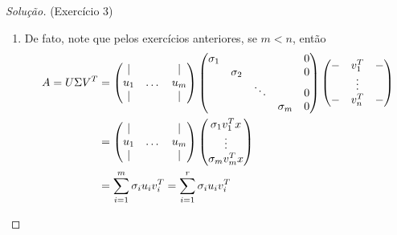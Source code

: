 \documentclass[a4paper,10pt]{article}
\newenvironment{solution}
  {\begin{proof}[Solução]}
  {\end{proof}}
\begin{document}
\begin{solution}{(Exercício 3)}
\begin{enumerate}
        \item De fato, note que pelos exercícios anteriores, se $m<n$, então
          \begin{equation*}
            \begin{split}
              A = U\Sigma V^T &=
              \begin{pmatrix}
                  \vert & & \vert \\
                  u_1 & \dots & u_m \\
                  \vert & & \vert
                \end{pmatrix}
                \begin{pmatrix}
                  \sigma_1 & & &  &0 \\
                  &\sigma_2 & & & 0 \\
                  & & \ddots & & 0 \\
                  & & &\sigma_m & 0
                \end{pmatrix}
                \begin{pmatrix}
                    \-- & v_1^T & \-- \\
                     & \vdots &  \\
                    \-- & v_n^T & \--
                \end{pmatrix} \\
                &= \begin{pmatrix}
                    \vert & & \vert \\
                    u_1 & \dots & u_m \\
                    \vert & & \vert
                  \end{pmatrix}
                  \begin{pmatrix}
                    \sigma_1v_1^Tx \\
                    \vdots \\
                    \sigma_mv_m^Tx
                  \end{pmatrix} \\
                &= \sum_{i=1}^{m}\sigma_iu_iv_i^T = \sum_{i=1}^{r}\sigma_iu_iv_i^T
            \end{split}
          \end{equation*}
    \end{enumerate}
  \end{solution}
\end{document}
